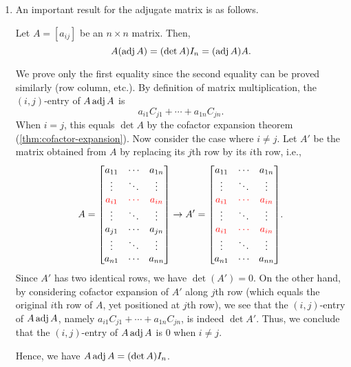 \begin{enumerate}
\item An important result for the adjugate matrix is as follows.
\begin{theorem}
\label{thm:a-adj-det-a}
Let \(A=[a_{ij}]\) be an \(n\times n\) matrix. Then,
\[
A(\operatorname{adj} A)=(\det A)I_n=(\operatorname{adj} A)A.
\]
\end{theorem}
\begin{pf}
We prove only the first equality since the second equality can be proved
similarly (row  column, etc.). By definition of matrix
multiplication, the \((i,j)\)-entry of \(A\operatorname{adj} A\) is 
\[
a_{i1}C_{j1}+\dotsb+a_{1n}C_{jn}.
\]
When \(i=j\), this equals \(\det A\) by the cofactor expansion theorem
(\cref{thm:cofactor-expansion}). Now consider the case where \(i\ne j\). Let
\(A'\) be the matrix obtained from \(A\) by replacing its \(j\)th row by its
\(i\)th row, i.e.,
\[
A=\mqty[
a_{11}&\cdots&a_{1n}\\
\vdots&\ddots&\vdots\\
\rc{a_{i1}}&\rc{\cdots}&\rc{a_{in}}\\
\vdots&\ddots&\vdots\\
a_{j1}&\cdots&a_{jn}\\
\vdots&\ddots&\vdots\\
a_{n1}&\cdots&a_{nn}\\
]
\to
A'=\mqty[
a_{11}&\cdots&a_{1n}\\
\vdots&\ddots&\vdots\\
\rc{a_{i1}}&\rc{\cdots}&\rc{a_{in}}\\
\vdots&\ddots&\vdots\\
\rc{a_{i1}}&\rc{\cdots}&\rc{a_{in}}\\
\vdots&\ddots&\vdots\\
a_{n1}&\cdots&a_{nn}\\
].
\]
Since \(A'\) has two identical rows, we have \(\det(A')=0\). On the other hand,
by considering cofactor expansion of \(A'\) along \(j\)th row (which equals the
original \(i\)th row of \(A\), yet positioned at \(j\)th row), we see that the
\((i,j)\)-entry of \(A\operatorname{adj} A\), namely \(a_{i1}C_{j1}+\dotsb+a_{1n}C_{jn}\), is
indeed \(\det A'\). Thus, we conclude that the \((i,j)\)-entry of \(A\operatorname{adj} A\)
is \(0\) when \(i\ne j\).

Hence, we have \(A\operatorname{adj} A=(\det A)I_n\).
\end{pf}


\end{enumerate}
